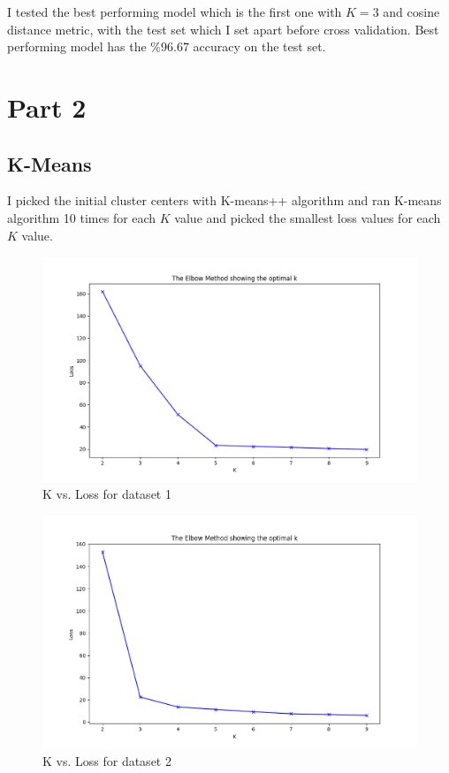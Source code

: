 \documentclass[12pt,a4paper, margin=1in]{article}
\begin{document}
I tested the best performing model which is the first one with $K = 3$ and cosine distance metric, with the test set which I set apart before cross validation.
Best performing model has the $\%96.67$ accuracy on the test set.

\pagebreak

\section{Part 2}

\subsection{K-Means}

I picked the initial cluster centers with K-means++ algorithm and ran K-means algorithm 10 times for each $K$ value and picked the smallest loss values for each $K$ value.

\begin{figure}[H]
    \centering
    \includegraphics[scale=0.7]{elbow_dataset1}
    \caption{K vs. Loss for dataset 1}
\end{figure}

\begin{figure}[H]
    \centering
    \includegraphics[scale=0.7]{elbow_dataset2}
    \caption{K vs. Loss for dataset 2}
\end{figure}
\end{document}

